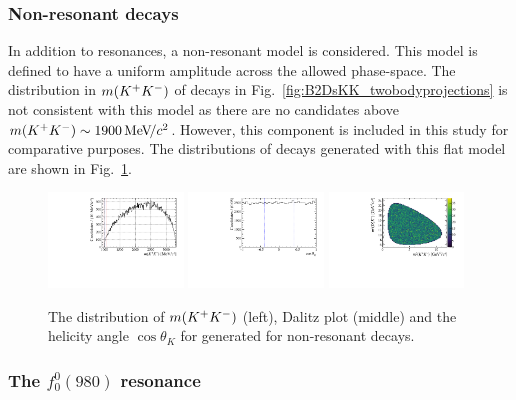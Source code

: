 \subsubsection{Non-resonant decays}

In addition to \Kp\Km resonances, a non-resonant model is considered. This model is defined to have a uniform amplitude across the allowed phase-space. The distribution in $m({{K}^+}{{K}^-})$ of \decay{\Bp}{\Dsp\Kp\Km} decays in Fig.~\ref{fig:B2DsKK_twobodyprojections} is not consistent with this model as there are no candidates above $m({{K}^+}{{K}^-}) \sim 1900{\mathrm{\,Me\kern -0.1em V\!/}c^2}$. However, this component is included in this study for comparative purposes. The distributions of decays generated with this flat model are shown in Fig.~\ref{fig:DsKK_model_NR}. 

\begin{figure}[!h]
   \centering   
   \includegraphics[width=0.32\textwidth]{figs/B2DsPhi/NR_phi_mass.pdf}
   \includegraphics[width=0.32\textwidth]{figs/B2DsPhi/NR_Helicity.pdf}
   \includegraphics[width=0.32\textwidth]{figs/B2DsPhi/NR_Dalitz_plot.pdf}
   \caption{The distribution of $m({{K}^+}{{K}^-})$ (left), Dalitz plot (middle) and the helicity angle $\cos\theta_{K}$ for generated for non-resonant decays.} 
   \label{fig:DsKK_model_NR}   
\end{figure}

\subsubsection{The $f_{0}^{0}(980)$ resonance}

